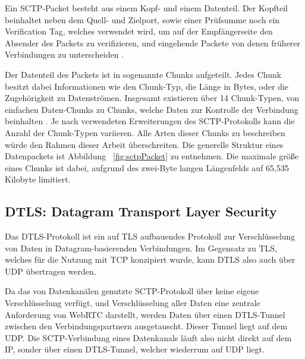 Ein \acs{SCTP}-Packet besteht aus einem Kopf- und einem Datenteil. Der Kopfteil beinhaltet neben dem Quell- und Zielport, sowie einer Prüfsumme noch ein \glqq{}Verification Tag\grqq{}, welches verwendet wird, um auf der Empfängerseite den Absender des Packets zu verifizieren, und eingehende Packete von denen früherer Verbindungen zu unterscheiden \cite{sctpRFC}.

Der Datenteil des Packets ist in sogenannte \glqq{}Chunks\grqq{}  aufgeteilt. Jedes \glqq{}Chunk\grqq{} besitzt dabei Informationen wie den Chunk-Typ, die Länge in Bytes, oder die Zugehörigkeit zu Datenströmen. Insgesamt existieren über 14 Chunk-Typen, von einfachen Daten-Chunks zu Chunks, welche Daten zur Kontrolle der Verbindung beinhalten \cite{sctpRFC}. Je nach verwendeten Erweiterungen des \acs{SCTP}-Protokolls kann die Anzahl der Chunk-Typen variieren. Alle Arten dieser \glqq Chunks\grqq{} zu beschreiben würde den Rahmen dieser Arbeit überschreiten. Die generelle Struktur eines Datenpackets ist Abbildung ~\ref{fig:sctpPacket} zu entnehmen. Die maximale größe eines \glqq{}Chunks\grqq{} ist dabei, aufgrund des zwei-Byte langen Längenfelds auf 65,535 Kilobyte limitiert.

\color{black}

\subsection{DTLS: Datagram Transport Layer Security}
Das \acf{DTLS}-Protokoll ist ein auf \acf{TLS} aufbauendes Protokoll zur Verschlüsselung von Daten in Datagram-basierenden Verbindungen. Im Gegensatz zu \acs{TLS}, welches für die Nutzung mit \acs{TCP} konzipiert wurde, kann \acs{DTLS} also auch über \acs{UDP} übertragen werden.\par

Da das von Datenkanälen genutzte \acs{SCTP}-Protokoll über keine eigene Verschlüsselung verfügt, und Verschlüsselung aller Daten eine zentrale Anforderung von \acs{WebRTC} darstellt, werden Daten über einen \acs{DTLS}-Tunnel zwischen den Verbindungspartnern ausgetauscht. Dieser Tunnel liegt auf dem \acf{UDP}. Die \acs{SCTP}-Verbindung eines Datenkanals läuft also nicht direkt auf dem \acf{IP}, sonder über einen \acs{DTLS}-Tunnel, welcher wiederrum auf \acs{UDP} liegt.

